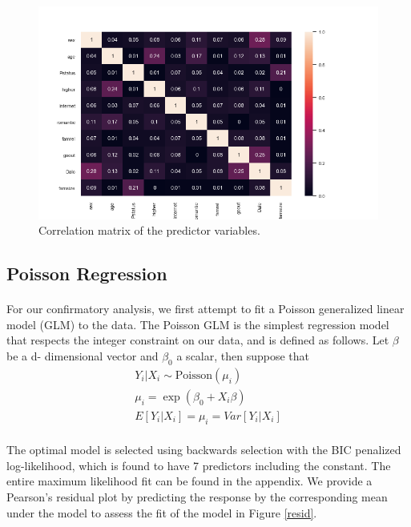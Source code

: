 \documentclass[12pt, titlepage]{article}
\begin{document}
	\begin{figure}[h!]
		\centering
		\includegraphics[width = \textwidth]{fig/Correlation.png}
		\caption{Correlation matrix of the predictor variables.}
		\label{corr}
	\end{figure}
	
	\subsection{Poisson Regression}
	\paragraph{} For our confirmatory analysis, we first attempt to fit a Poisson generalized linear model (GLM) to the data. The Poisson GLM is the simplest regression model that respects the integer constraint on our data, and is defined as follows. Let $\beta$ be a d- dimensional vector and $\beta_0$ a scalar, then suppose that
	\begin{gather*}
	Y_i|X_i \sim \text{Poisson}(\mu_i) \\
	\mu_i = \exp(\beta_0 + X_i\beta) \\
	E[Y_i|X_i] = \mu_i = Var[Y_i|X_i]
	\end{gather*} 
	\paragraph{} The optimal model is selected using backwards selection with the BIC penalized log-likelihood, which is found to have 7 predictors including the constant. The entire maximum likelihood fit can be found in the appendix. We provide a Pearson's residual plot by predicting the response by the corresponding mean under the model to assess the fit of the model in Figure \ref{resid}. 
	
\end{document}
